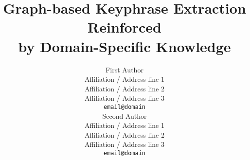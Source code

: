 \documentclass[11pt]{article}
\title{Graph-based Keyphrase Extraction Reinforced\\by Domain-Specific Knowledge}
\author{First Author \\
  Affiliation / Address line 1 \\
  Affiliation / Address line 2 \\
  Affiliation / Address line 3 \\
  {\tt email@domain} \\\And
  Second Author \\
  Affiliation / Address line 1 \\
  Affiliation / Address line 2 \\
  Affiliation / Address line 3 \\
  {\tt email@domain} \\}
\date{}
\newcommand\FILL[1]{\textcolor{red}{\lipsum[#1]}}
\begin{document}
  \maketitle

  \begin{abstract}
    \FILL{1}
  \end{abstract}

  
  
  
  
  
  
  


  
  
\end{document}
